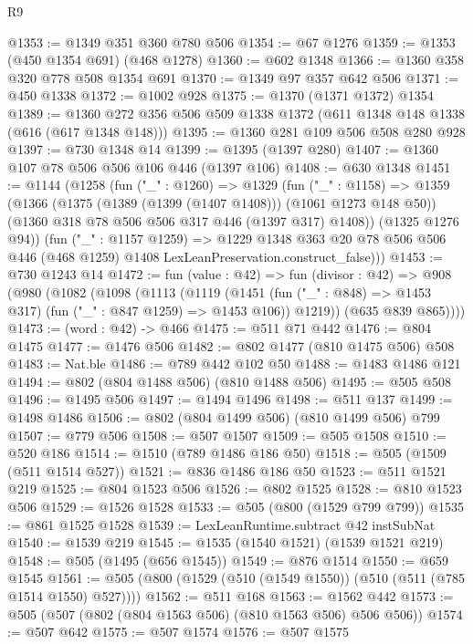 \begin{lexlean}{R9}
\begin{coremodule}
@1353 := @1349 @351 @360 @780 @506
@1354 := @67 @1276
@1359 := @1353 (@450 @1354 @691) (@468 @1278)
@1360 := @602 @1348
@1366 := @1360 @358 @320 @778 @508 @1354 @691
@1370 := @1349 @97 @357 @642 @506
@1371 := @450 @1338
@1372 := @1002 @928
@1375 := @1370 (@1371 @1372) @1354
@1389 := @1360 @272 @356 @506 @509 @1338 @1372 (@611 @1348 @148 @1338 (@616 (@617 @1348 @148)))
@1395 := @1360 @281 @109 @506 @508 @280 @928
@1397 := @730 @1348 @14
@1399 := @1395 (@1397 @280)
@1407 := @1360 @107 @78 @506 @506 @106 @446 (@1397 @106)
@1408 := @630 @1348
@1451 := @1144
    (@1258
      (fun ("_" : @1260) =>
      @1329
        (fun ("_" : @1158) =>
        @1359
          (@1366
            (@1375 (@1389 (@1399 (@1407 @1408))) (@1061 @1273 @148 @50))
            (@1360 @318 @78 @506 @506 @317 @446 (@1397 @317) @1408))
          (@1325 @1276 @94))
        (fun ("_" : @1157 @1259) =>
        @1229
          @1348
          @363
          @20
          @78
          @506
          @506
          @446
          (@468 @1259)
          @1408
          LexLeanPreservation.construct_false)))
@1453 := @730 @1243 @14
@1472 := fun (value : @42) =>
  fun (divisor : @42) =>
  @908
    (@980
      (@1082
        (@1098
          (@1113
            (@1119
              (@1451 (fun ("_" : @848) => @1453 @317) (fun ("_" : @847 @1259) => @1453 @106))
              @1219))
          (@635 @839 @865))))
@1473 := (word : @42) -> @466
@1475 := @511 @71 @442
@1476 := @804 @1475
@1477 := @1476 @506
@1482 := @802 @1477 (@810 @1475 @506) @508
@1483 := Nat.ble
@1486 := @789 @442 @102 @50
@1488 := @1483 @1486 @121
@1494 := @802 (@804 @1488 @506) (@810 @1488 @506)
@1495 := @505 @508
@1496 := @1495 @506
@1497 := @1494 @1496
@1498 := @511 @137
@1499 := @1498 @1486
@1506 := @802 (@804 @1499 @506) (@810 @1499 @506) @799
@1507 := @779 @506
@1508 := @507 @1507
@1509 := @505 @1508
@1510 := @520 @186
@1514 := @1510 (@789 @1486 @186 @50)
@1518 := @505 (@1509 (@511 @1514 @527))
@1521 := @836 @1486 @186 @50
@1523 := @511 @1521 @219
@1525 := @804 @1523 @506
@1526 := @802 @1525
@1528 := @810 @1523 @506
@1529 := @1526 @1528
@1533 := @505 (@800 (@1529 @799 @799))
@1535 := @861 @1525 @1528
@1539 := LexLeanRuntime.subtract @42 instSubNat
@1540 := @1539 @219
@1545 := @1535 (@1540 @1521) (@1539 @1521 @219)
@1548 := @505 (@1495 (@656 @1545))
@1549 := @876 @1514
@1550 := @659 @1545
@1561 := @505 (@800 (@1529 (@510 (@1549 @1550)) (@510 (@511 (@785 @1514 @1550) @527))))
@1562 := @511 @168
@1563 := @1562 @442
@1573 := @505 (@507 (@802 (@804 @1563 @506) (@810 @1563 @506) @506 @506))
@1574 := @507 @642
@1575 := @507 @1574
@1576 := @507 @1575

\end{coremodule}
\end{lexlean}
